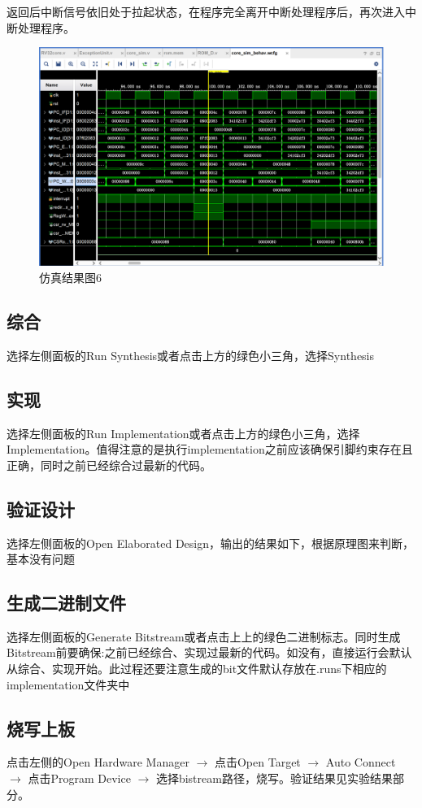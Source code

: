 返回后中断信号依旧处于拉起状态，在程序完全离开中断处理程序后，再次进入中断处理程序。
\begin{figure}[H] %
	\centering %
	\includegraphics[width=1.0\textwidth]{figs/6.png} %
	\caption{仿真结果图6} %
	\label{Fig.16} %
\end{figure}
\subsection{综合} 选择左侧面板的Run Synthesis或者点击上方的绿色小三角，选择Synthesis
\subsection{实现} 选择左侧面板的Run Implementation或者点击上方的绿色小三角，选择Implementation。值得注意的是执行implementation之前应该确保引脚约束存在且正确，同时之前已经综合过最新的代码。
\subsection{验证设计} 选择左侧面板的Open Elaborated Design，输出的结果如下，根据原理图来判断，基本没有问题
\subsection{生成二进制文件} 选择左侧面板的Generate Bitstream或者点击上上的绿色二进制标志。同时生成Bitstream前要确保:之前已经综合、实现过最新的代码。如没有，直接运行会默认从综合、实现开始。此过程还要注意生成的bit文件默认存放在.runs下相应的implementation文件夹中
\subsection{烧写上板} 点击左侧的Open Hardware Manager $\rightarrow$ 点击Open Target $\rightarrow$ Auto Connect $\rightarrow$ 点击Program Device $\rightarrow$ 选择bistream路径，烧写。验证结果见实验结果部分。
